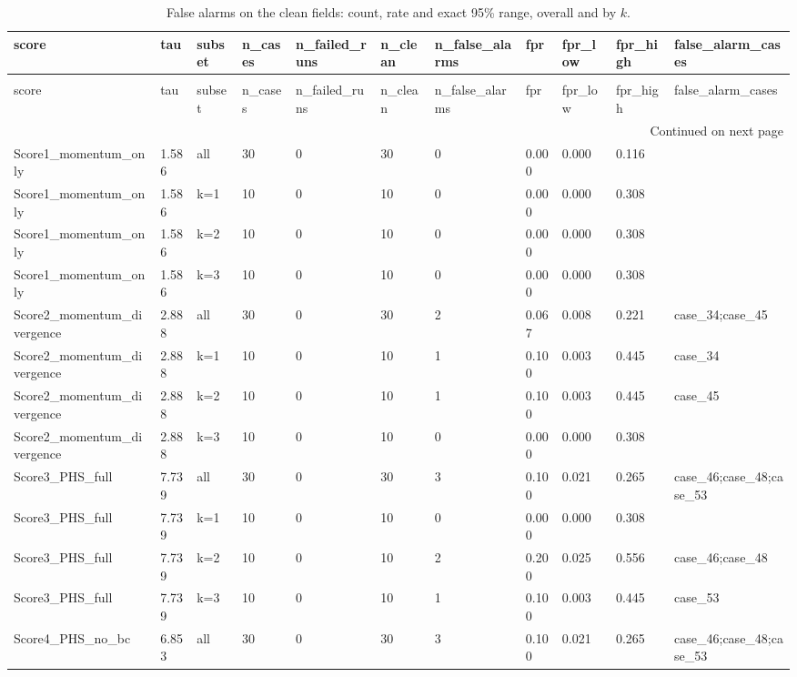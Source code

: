 \begin{longtable}{lllllllllll}
\caption{False alarms on the clean fields: count, rate and exact 95\% range, overall and by $k$.} \label{tab:benchmark_clean_false_positives} \\
\toprule
score & tau & subset & n\_cases & n\_failed\_runs & n\_clean & n\_false\_alarms & fpr & fpr\_low & fpr\_high & false\_alarm\_cases \\
\midrule
\endfirsthead
\caption[]{False alarms on the clean fields: count, rate and exact 95\% range, overall and by $k$.} \\
\toprule
score & tau & subset & n\_cases & n\_failed\_runs & n\_clean & n\_false\_alarms & fpr & fpr\_low & fpr\_high & false\_alarm\_cases \\
\midrule
\endhead
\midrule
\multicolumn{11}{r}{Continued on next page} \\
\midrule
\endfoot
\bottomrule
\endlastfoot
Score1\_momentum\_only & 1.586 & all & 30 & 0 & 30 & 0 & 0.000 & 0.000 & 0.116 &  \\
Score1\_momentum\_only & 1.586 & k=1 & 10 & 0 & 10 & 0 & 0.000 & 0.000 & 0.308 &  \\
Score1\_momentum\_only & 1.586 & k=2 & 10 & 0 & 10 & 0 & 0.000 & 0.000 & 0.308 &  \\
Score1\_momentum\_only & 1.586 & k=3 & 10 & 0 & 10 & 0 & 0.000 & 0.000 & 0.308 &  \\
Score2\_momentum\_divergence & 2.888 & all & 30 & 0 & 30 & 2 & 0.067 & 0.008 & 0.221 & case\_34;case\_45 \\
Score2\_momentum\_divergence & 2.888 & k=1 & 10 & 0 & 10 & 1 & 0.100 & 0.003 & 0.445 & case\_34 \\
Score2\_momentum\_divergence & 2.888 & k=2 & 10 & 0 & 10 & 1 & 0.100 & 0.003 & 0.445 & case\_45 \\
Score2\_momentum\_divergence & 2.888 & k=3 & 10 & 0 & 10 & 0 & 0.000 & 0.000 & 0.308 &  \\
Score3\_PHS\_full & 7.739 & all & 30 & 0 & 30 & 3 & 0.100 & 0.021 & 0.265 & case\_46;case\_48;case\_53 \\
Score3\_PHS\_full & 7.739 & k=1 & 10 & 0 & 10 & 0 & 0.000 & 0.000 & 0.308 &  \\
Score3\_PHS\_full & 7.739 & k=2 & 10 & 0 & 10 & 2 & 0.200 & 0.025 & 0.556 & case\_46;case\_48 \\
Score3\_PHS\_full & 7.739 & k=3 & 10 & 0 & 10 & 1 & 0.100 & 0.003 & 0.445 & case\_53 \\
Score4\_PHS\_no\_bc & 6.853 & all & 30 & 0 & 30 & 3 & 0.100 & 0.021 & 0.265 & case\_46;case\_48;case\_53 \\

\end{longtable}
